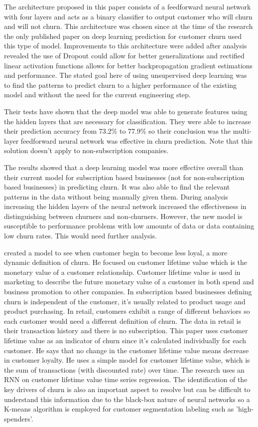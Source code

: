 \documentclass[final,a4paper,peerreviewca]{IEEEtran}
\begin{document}
The architecture proposed in this paper consists of a feedforward neural network with four layers and acts as a binary classifier to output customer who will churn and will not churn. This architecture was chosen since at the time of the research the only published paper on deep learning prediction for customer churn \cite{Castanedo:2015} used this type of model. Improvements to this architecture were added after analysis revealed the use of Dropout could allow for better generalizations and rectified linear activation functions allows for better backpropagation gradient estimations and performance. The stated goal here of using unsupervised deep learning was to find the patterns to predict churn to a higher performance of the existing model and without the need for the current engineering step.

Their tests have shown that the deep model was able to generate features using the hidden layers that are necessary for classification. They were able to increase their prediction accuracy from 73.2\% to 77.9\% so their conclusion was the multi-layer feedforward neural network was effective in churn prediction. Note that this solution doesn't apply to non-subscription companies.

The results showed that a deep learning model was more effective overall than their current model for subscription based businesses (not for non-subscription based businesses) in predicting churn. It was also able to find the relevant patterns in the data without being manually given them. During analysis increasing the hidden layers of the neural network increased the effectiveness in distinguishing between churners and non-churners. However, the new model is susceptible to performance problems with low amounts of data or data containing low churn rates. This would need further analysis.

\cite{Ljungehed:2017} created a model to see when customer begin to become less loyal, a more dynamic definition of churn. He focused on customer lifetime value which is the monetary value of a customer relationship. Customer lifetime value is used in marketing to describe the future monetary value of a customer in both spend and business promotion to other companies. In subscription based businesses defining churn is independent of the customer, it's usually related to product usage and product purchasing. In retail, customers exhibit a range of different behaviors so each customer would need a different definition of churn. The data in retail is their transaction history and there is no subscription. This paper uses customer lifetime value as an indicator of churn since it's calculated individually for each customer. He says that no change in the customer lifetime value means decrease in customer loyalty. He uses a simple model for customer lifetime value, which is the sum of transactions (with discounted rate) over time. The research uses an RNN on customer lifetime value time series regression. The identification of the key drivers of churn is also an important aspect to resolve but can be difficult to understand this information due to the black-box nature of neural networks so a K-means algorithm is employed for customer segmentation labeling such as 'high-spenders'. 
\end{document}
